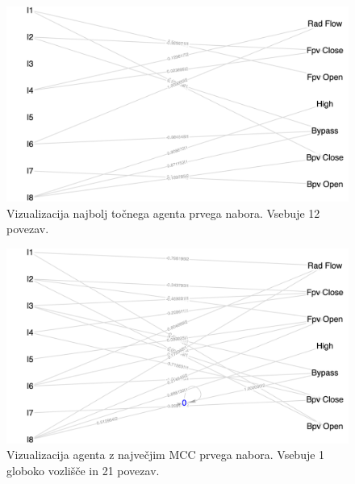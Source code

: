 \begin{figure}[H]
    \begin{center}
        \includegraphics[width=13cm]{shuttle/1/acc_g}
    \end{center}
    \caption{Vizualizacija najbolj točnega agenta prvega nabora. Vsebuje 12 povezav.}
    \label{fig:statlog_acc_1_g}
\end{figure}

\begin{figure}[H]
    \begin{center}
        \includegraphics[width=13cm]{shuttle/1/mcc_g}
    \end{center}
    \caption{Vizualizacija agenta z največjim MCC prvega nabora. Vsebuje 1 globoko vozlišče in 21 povezav.}
    \label{fig:statlog_mcc_1_g}
\end{figure}

